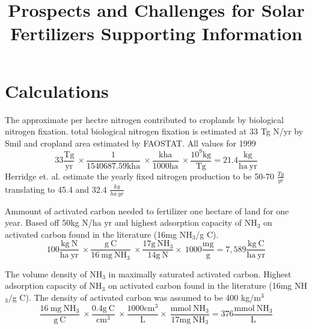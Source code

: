 \documentclass[journal=jacsat,manuscript=article]{achemso}
\title{Prospects and Challenges for Solar Fertilizers Supporting Information}
\begin{document}
\renewcommand{\thepage}{S\arabic{page}}
\renewcommand{\theequation}{S\arabic{equation}}
\renewcommand{\thetable}{S\arabic{table}}
\renewcommand{\thefigure}{S\arabic{figure}}
\newpage
{}
\listoftables
\listoffigures
\newpage

\section{Calculations}

The approximate per hectre nitrogen contributed to croplands by biological nitrogen fixation. total biological nitrogen fixation is estimated at 33 Tg N/yr by Smil\cite{Smil_1999_2} and cropland area estimated by FAOSTAT. All values for 1999
\begin{equation}
\mathrm{
33 \frac{Tg}{yr} \: \times \frac{1}{1540687.59 kha} \: \times \frac{kha}{1000 ha} \: \times \frac{10^{9} kg}{Tg} = 21.4 \frac{kg}{ha\:yr}
}


\end{equation}
Herridge et. al. \cite{Herridge_2008} estimate the yearly fixed nitrogen production to be 50-70 $\frac{Tg}{yr}$ translating to 45.4 and 32.4 $\frac{kg}{ha \: yr}$


Ammount of activated carbon needed to fertilizer one hectare of land for one year. Based off 50kg N/ha yr and highest adsorption capacity of NH$_3$ on activated carbon found in the literature (16mg NH$_3$/g C)\cite{Gon_alves_2011}.
\begin{equation}
\mathrm{ 100 \frac{kg \: N}{ha \: yr} \: \times \frac{g \: C}{16 \: mg \: NH_3} \: \times \frac{17g\:NH_3}{14g\:N}  \times \: 1000 \frac{mg}{g} = 7,589 \frac{kg\:C}{ha \: yr}
}
\end{equation}

The volume density of NH$_3$ in maximally saturated activated carbon. Highest adsorption capacity of NH$_3$ on activated carbon found in the literature (16mg NH$_3$/g C)\cite{Gon_alves_2011}. The density of activated carbon was assumed to be 400 kg/m$^3$
\begin{equation}
\mathrm{\frac{16 \: mg \: NH_3}{g \: C} \: \times \frac{0.4g \:C}{cm^3} \: \times \frac{1000 cm^3}{L}  \times \: \frac{mmol \: NH_3}{17 mg \: NH_3} = 376 \frac{mmol\:NH_3}{L}
}
\end{equation}
\end{document}
